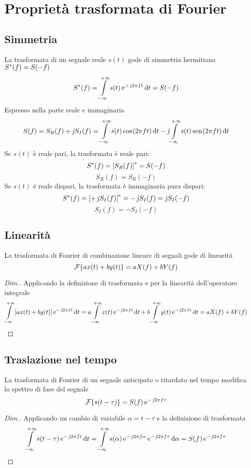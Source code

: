 \section{Proprietà trasformata di Fourier}
\subsection{Simmetria}
La trasformata di un segnale reale $s(t)$ gode di simmetria hermitiana $\conj{S}(f)=S(-f)$
\begin{equation}\conj{S}(f)=\intinf{s(t)\e{+\imath 2\pi f t}}{t}=S(-f)\end{equation}
Espresso nella parte reale e immaginaria
\[S(f)=S_R(f)+\imath S_I(f)=\intinf{s(t)\cos{2\pi f t}}{t}-\imath\intinf{s(t)\sen{2\pi f t}}{t}\]
Se $s(t)$ è reale pari, la trasformata è reale pari: \[\conj{S}(f)=\conj{[S_R(f)]}=S(-f)\] \[S_R(f)=S_R(-f)\]
Se $s(t)$ è reale dispari, la trasformata è immaginaria pura dispari:
\[\conj{S}(f)=\conj{[+\imath S_I(f)]}=-\imath S_I(f)=\imath S_I(-f)\] \[S_I(f)=-S_I(-f)\]

\subsection{Linearità}
La trasformata di Fourier di combinazione lineare di segnali gode di linearità
\begin{equation}
\fourier{a x(t)+ b y(t)}= a X(f)+ b Y(f)
\end{equation}

\begin{proof}[Dim.]
Applicando la definizione di trasformata e per la linearità dell'operatore integrale
\[ \intinf{\left[a x(t)+ b y(t)\right]\e{-\imath 2\pi f t}}{t}= a\intinf{x(t)\e{-\imath 2\pi f t}}{t} + b\intinf{y(t)\e{-\imath 2\pi f t}}{t}= a X(f) + b Y(f) \]
\end{proof}

\subsection{Traslazione nel tempo}
La trasformata di Fourier di un segnale anticipato o ritardato nel tempo modifica lo spettro di fase del segnale
\begin{equation}
\fourier{s(t-\tau)}= S(f)\e{-\imath 2\pi f \tau}
\label{eq:trasf_Fourier_trasl}
\end{equation}
\begin{proof}[Dim.]
Applicando un cambio di variabile $\alpha=t-\tau$ e la definizione di trasformata
\[\intinf{s(t-\tau)\e{-\imath 2\pi f t}}{t}=
\intinf{s(\alpha)\e{-\imath 2\pi f\alpha}\e{-\imath 2\pi f\tau}}{\alpha}=S(f)\e{-\imath 2\pi f\tau}\]
\end{proof}

